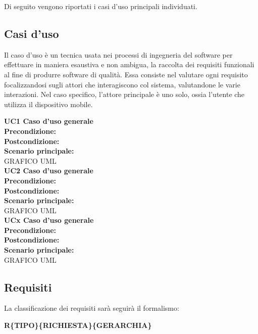 Di seguito vengono riportati i casi d'uso principali individuati.

\subsection{Casi d'uso}

Il caso d'uso è un tecnica usata nei processi di ingegneria del software per effettuare in maniera esaustiva e non ambigua, la raccolta dei requisiti funzionali al fine di produrre software di qualità.
Essa consiste nel valutare ogni requisito focalizzandosi sugli attori che interagiscono col sistema, valutandone le varie interazioni. Nel caso specifico, l'attore
principale è uno solo, ossia l'utente che utilizza il dispositivo mobile.

\textbf{UC1 Caso d'uso generale}
\\
\textbf{Precondizione:}
\\
\textbf{Postcondizione:}
\\
\textbf{Scenario principale:}
\\
GRAFICO UML
\\


\textbf{UC2 Caso d'uso generale}
\\
\textbf{Precondizione:}
\\
\textbf{Postcondizione:}
\\
\textbf{Scenario principale:}
\\
GRAFICO UML
\\


\textbf{UCx Caso d'uso generale}
\\
\textbf{Precondizione:}
\\
\textbf{Postcondizione:}
\\
\textbf{Scenario principale:}
\\
GRAFICO UML
\\

\subsection{Requisiti}



La classificazione dei requisiti sarà seguirà il formalismo:
\begin{center}
	\textbf{R\{TIPO\}\{RICHIESTA\}\{GERARCHIA\}}
\end{center}

